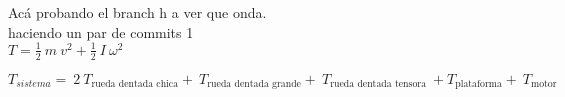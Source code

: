 \documentclass[12pt,a4paper]{article}
\begin{document}
\begin{landscape}
Acá probando el branch h a ver que onda.\\
haciendo un par de commits 1\\
$T = \frac{1}{2}~m~v^{2}+\frac{1}{2}~I~\omega^{2}$\\\vspace{0.8cm}

$T_{sistema}=~2~T_{\text{rueda dentada chica}}+~T_{\text{rueda dentada grande}}+~T_{\text{rueda dentada tensora}}~+T_{\text{plataforma}}+~T_{\text{motor}}$
\end{landscape}
%
%
%
%
%	
%	
\end{document}
